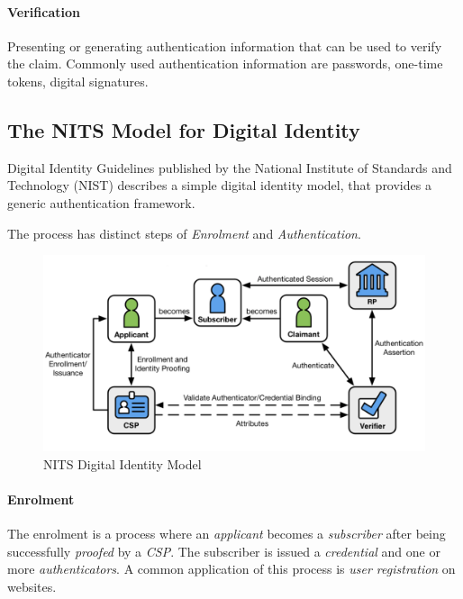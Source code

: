 \paragraph{Verification} Presenting or generating authentication information that can be used to verify the claim.
Commonly used authentication information are passwords, one-time tokens, digital signatures.

\subsection{The NITS Model for Digital Identity}

Digital Identity Guidelines \cite{grassi2017} published by the National Institute of Standards and Technology (NIST) describes a simple digital identity model, that provides a generic authentication framework.

The process has distinct steps of \textit{Enrolment} and \textit{Authentication}.

\begin{figure}[h]
	\centering
	\includegraphics[width=13cm]{images/NIST_digital_identity_model}
	\caption{NITS Digital Identity Model}
	\label{fig:NIST-digital-identity-model}
\end{figure}

\paragraph{Enrolment}

The enrolment is a process where an \textit{applicant} becomes a \textit{subscriber} after being successfully \textit{proofed} by a \textit{CSP}.
The subscriber is issued a \textit{credential} and one or more \textit{authenticators}.
\bigskip
\newline
A common application of this process is \textit{user registration} on websites.

